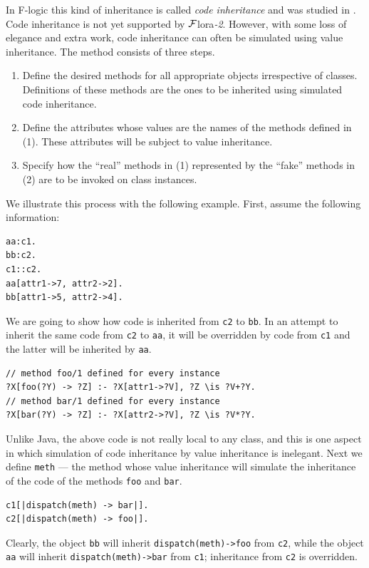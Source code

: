\documentclass[11pt]{article}
\newcommand{\FLSYSTEM}{{\mbox{\sc ${\cal F}${lora}\rm\emph{-2}}}\xspace}
\newcommand{\fl}{\mbox{F-logic}\xspace}
\begin{document}
In \fl this kind of inheritance is called \emph{code inheritance} and was
studied in \cite{code-inheritance-2003,kifer-yang-inheritance-2006}. Code inheritance is not yet
supported by \FLSYSTEM. However, with some loss of
elegance and extra work, code inheritance can often be simulated using value
inheritance. The method consists of three steps.
\begin{enumerate}
\item  Define the desired methods for all appropriate objects irrespective of
  classes. Definitions of these methods are the ones to be inherited using
  simulated code inheritance.
\item Define the attributes whose values are the names of the methods defined
  in (1).  These attributes will be subject to value inheritance.
\item  Specify how the ``real'' methods in (1) represented by
  the ``fake'' methods in (2) are to be invoked on class instances.
\end{enumerate}
We illustrate this process with the following example. First, assume the
following information:
\begin{verbatim}
aa:c1.
bb:c2.
c1::c2.
aa[attr1->7, attr2->2].
bb[attr1->5, attr2->4].  
\end{verbatim}
We are going to show how code is inherited from {\tt c2} to {\tt bb}. In
an attempt to inherit the same code from {\tt c2} to {\tt aa}, it
will be overridden by code from {\tt c1} and the latter will be inherited
by {\tt aa}. 
\begin{verbatim}
// method foo/1 defined for every instance
?X[foo(?Y) -> ?Z] :- ?X[attr1->?V], ?Z \is ?V+?Y.
// method bar/1 defined for every instance
?X[bar(?Y) -> ?Z] :- ?X[attr2->?V], ?Z \is ?V*?Y.  
\end{verbatim}
Unlike Java, the above code is not really local to any class, and this is
one aspect in which simulation of code inheritance by value inheritance is
inelegant. Next we define {\tt meth} --- the method whose
value inheritance will simulate the inheritance of the code of the methods
{\tt foo} and {\tt bar}.   
\begin{verbatim}
c1[|dispatch(meth) -> bar|].  
c2[|dispatch(meth) -> foo|].
\end{verbatim}
Clearly, the object {\tt bb} will inherit {\tt dispatch(meth)->foo} from
{\tt c2},
while the object {\tt aa}    will inherit {\tt dispatch(meth)->bar} from
{\tt c1};
inheritance from {\tt c2} is overridden.  
\end{document}
